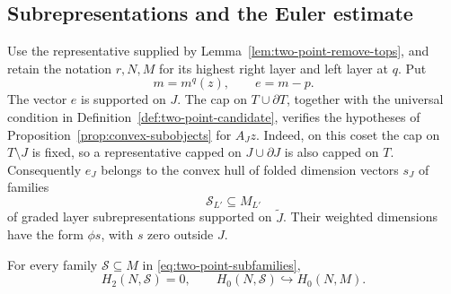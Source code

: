 \FloatBarrier
\subsection{Subrepresentations and the Euler estimate}

Use the representative supplied by
Lemma~\ref{lem:two-point-remove-tops}, and retain the notation
\(r,N,M\) for its highest right layer and left layer at \(q\).
Put
\[
 m=m^q(z),\qquad e=m-p.
\]
The vector \(e\) is supported on \(J\).  The cap on
\(T\cup\partial T\), together with the universal condition in
Definition~\ref{def:two-point-candidate}, verifies the hypotheses of
Proposition~\ref{prop:convex-subobjects} for \(A_Jz\).  Indeed, on
this coset the cap on \(T\setminus J\) is fixed, so a representative
capped on \(J\cup\partial J\) is also capped on \(T\).
Consequently \(e_J\) belongs to the convex hull of folded dimension
vectors \(s_J\) of families
\begin{equation}
\label{eq:two-point-subfamilies}
 \mathcal S_{L'}\subseteq M_{L'}
\end{equation}
of graded layer subrepresentations supported on \(\widetilde J\).
Their weighted dimensions have the form \(\phi s\), with \(s\)
zero outside \(J\).

\begin{lemma}
\label{lem:two-point-subrepresentation-tensor}
For every family \(\mathcal S\subseteq M\) in
\eqref{eq:two-point-subfamilies},
\begin{equation}
\label{eq:two-point-subrepresentation-homology}
 H_2(N,\mathcal S)=0,
 \qquad
 H_0(N,\mathcal S)\hookrightarrow H_0(N,M).
\end{equation}
\end{lemma}

